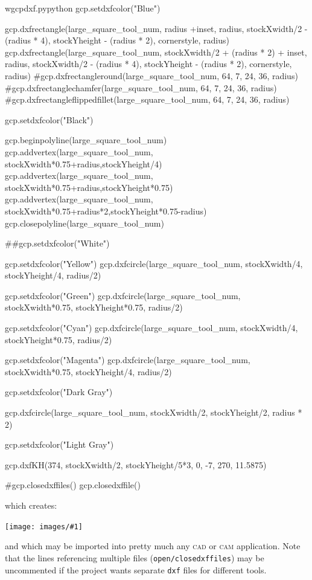 \documentclass{ltxdoc}
\newcommand{\includeimage}[1]{\bigskip\noindent\texttt{[image: images/\#1]}\bigskip}
\begin{document}
\begin{writecode}{w}{gcpdxf.py}{python}
gcp.setdxfcolor("Blue")

gcp.dxfrectangle(large_square_tool_num, radius +inset, radius, stockXwidth/2 - (radius * 4), stockYheight - (radius * 2), cornerstyle, radius) 
gcp.dxfrectangle(large_square_tool_num, stockXwidth/2 + (radius * 2) + inset, radius, stockXwidth/2 - (radius * 4), stockYheight - (radius * 2), cornerstyle, radius) 
#gcp.dxfrectangleround(large_square_tool_num, 64, 7, 24, 36, radius)
#gcp.dxfrectanglechamfer(large_square_tool_num, 64, 7, 24, 36, radius)
#gcp.dxfrectangleflippedfillet(large_square_tool_num, 64, 7, 24, 36, radius)

gcp.setdxfcolor("Black")

gcp.beginpolyline(large_square_tool_num)
gcp.addvertex(large_square_tool_num, stockXwidth*0.75+radius,stockYheight/4)
gcp.addvertex(large_square_tool_num, stockXwidth*0.75+radius,stockYheight*0.75)
gcp.addvertex(large_square_tool_num, stockXwidth*0.75+radius*2,stockYheight*0.75-radius)
gcp.closepolyline(large_square_tool_num)

##gcp.setdxfcolor("White")

gcp.setdxfcolor("Yellow")
gcp.dxfcircle(large_square_tool_num, stockXwidth/4, stockYheight/4, radius/2)

gcp.setdxfcolor("Green")
gcp.dxfcircle(large_square_tool_num, stockXwidth*0.75, stockYheight*0.75, radius/2)

gcp.setdxfcolor("Cyan")
gcp.dxfcircle(large_square_tool_num, stockXwidth/4, stockYheight*0.75, radius/2)

gcp.setdxfcolor("Magenta")
gcp.dxfcircle(large_square_tool_num, stockXwidth*0.75, stockYheight/4, radius/2)

gcp.setdxfcolor("Dark Gray")

gcp.dxfcircle(large_square_tool_num, stockXwidth/2, stockYheight/2, radius * 2)

gcp.setdxfcolor("Light Gray")

gcp.dxfKH(374, stockXwidth/2, stockYheight/5*3, 0, -7, 270, 11.5875)

#gcp.closedxffiles()
gcp.closedxffile()

\end{writecode}
\addtocounter{gcpdxfpy}{84}

\noindent which creates:

\bigskip

\includeimage{gcpdxf.pdf}

\bigskip

\noindent and which may be imported into pretty much any \textsc{cad} or \textsc{cam} application. Note that the lines referencing multiple files (\verb|open/closedxffiles|) may be uncommented if the project wants separate \verb|dxf| files for different tools.
\end{document}
